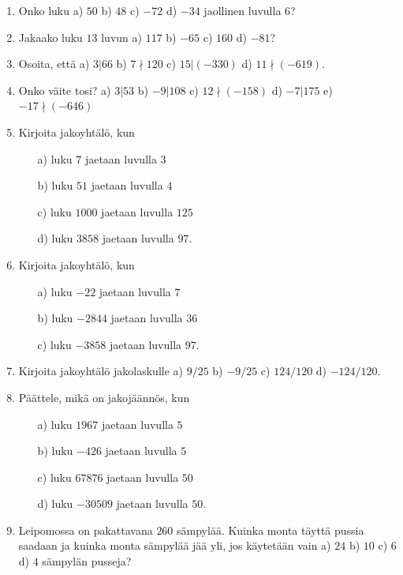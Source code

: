 \begin{enumerate}

\item Onko luku a) $50$ b) $48$ c) $-72$ d) $-34$ jaollinen luvulla $6$?

\item Jakaako luku $13$ luvun a) $117$ b) $-65$ c) $160$ d) $-81$?

\item Osoita, että a) $3|66$ b) $7\nmid 120$ c) $15|(-330)$ d) $11\nmid (-619)$.

\item Onko väite tosi? a) $3|53$ b) $-9|108$ c) $12 \nmid (-158)$ d) $-7|175$ e) $-17 \nmid (-646)$

\item Kirjoita jakoyhtälö, kun
\begin{itemize}
\item[a)] luku $7$ jaetaan luvulla $3$
\item[b)] luku $51$ jaetaan luvulla $4$
\item[c)] luku $1000$ jaetaan luvulla $125$
\item[d)] luku $3858$ jaetaan luvulla $97$.
\end{itemize}

\item Kirjoita jakoyhtälö, kun
\begin{itemize}
\item[a)] luku $-22$ jaetaan luvulla $7$
\item[b)] luku $-2844$ jaetaan luvulla $36$
\item[c)] luku $-3858$ jaetaan luvulla $97$.
\end{itemize}

\item Kirjoita jakoyhtälö jakolaskulle a) $9/25$ b) $-9/25$ c) $124/120$ d) $-124/120$.

\item Päättele, mikä on jakojäännös, kun
\begin{itemize}
\item[a)] luku $1967$ jaetaan luvulla $5$
\item[b)] luku $-426$ jaetaan luvulla $5$
\item[c)] luku $67876$ jaetaan luvulla $50$
\item[d)] luku $-30509$ jaetaan luvulla $50$.
\end{itemize}

\item Leipomossa on pakattavana $260$ sämpylää. Kuinka monta täyttä pussia saadaan ja kuinka monta sämpylää jää yli, jos käytetään vain a) $24$ b) $10$ c) $6$ d) $4$ sämpylän pusseja?


\end{enumerate}

